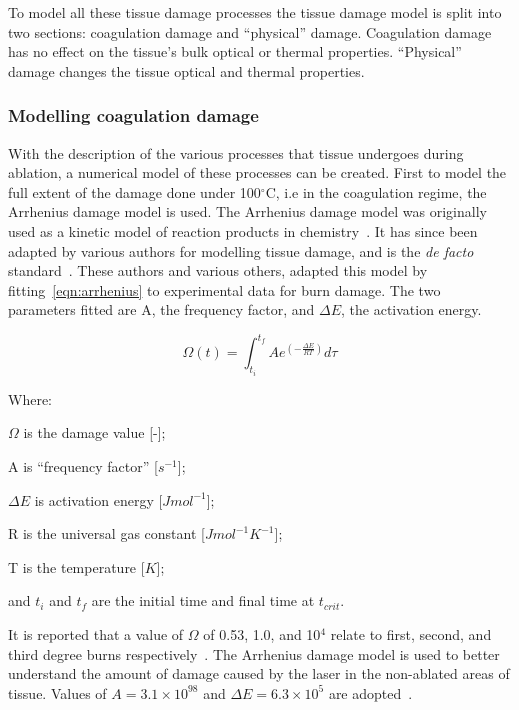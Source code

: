 To model all these tissue damage processes the tissue damage model is split into two sections: coagulation damage and ``physical'' damage. Coagulation damage has no effect on the tissue's bulk optical or thermal properties. ``Physical'' damage changes the tissue optical and thermal properties.

\subsubsection*{Modelling coagulation damage}\label{sec:coagdamage}
With the description of the various processes that tissue undergoes during ablation, a numerical model of these processes can be created.
First to model the full extent of the damage done under 100${^{\circ}}$C, i.e in the coagulation regime, the Arrhenius damage model is used. The Arrhenius damage model was originally used as a kinetic model of reaction products in chemistry~\cite{pearce2009relationship}. It has since been adapted by various authors for modelling tissue damage, and is the \textit{de facto} standard~\cite{hendriques1947studies,jiang2002effects}. These authors and various others, adapted this model by fitting~\cref{eqn:arrhenius} to experimental data for burn damage. The two parameters fitted are A, the frequency factor, and $\Delta E$, the activation energy.

\begin{equation}
\Omega(t)=\int^{t_{f}}_{t_i} Ae^{(-\tfrac{\Delta E}{RT})}d\tau
\label{eqn:arrhenius}
\end{equation}


\noindent Where:

	\indent $\Omega$ is the damage value [-];
	
	\indent A is ``frequency factor'' [$s^{-1}$];
	
	\indent $\Delta E$ is activation energy [$J mol^{-1}$];
	
	\indent R is the universal gas constant [$J mol^{-1} K^{-1}$];
	
	\indent T is the temperature [$K$];
	
	\indent and $t_i$ and $t_f$ are the initial time and final time at $t_{crit}$.
	
	\medskip

It is reported that a value of $\Omega$ of 0.53, 1.0, and 10$^4$ relate to first, second, and third degree burns respectively~\cite{diller1983finite}. The Arrhenius damage model is used to better understand the amount of damage caused by the laser in the non-ablated areas of tissue. Values of $A=3.1\times10^{98}$ and $\Delta E=6.3\times10^5$ are adopted~\cite{zhang2007dynamic,sagi1992heating,hendriques1947studies}.

